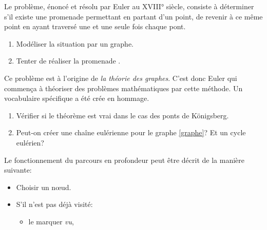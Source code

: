 \documentclass[a4paper,11pt]{article}
\begin{document}
\begin{Form}
\begin{exo}
Le problème, énoncé et résolu par Euler au XVIII° siècle, consiste à déterminer s'il existe une promenade permettant en partant d'un point, de revenir à ce même point en ayant traversé une et une seule fois chaque pont.
\begin{enumerate}
\item Modéliser la situation par un graphe.
\item Tenter de réaliser la promenade .
\end{enumerate}
Ce problème est à l'origine de \emph{la théorie des graphes}. C'est donc Euler qui commença à théoriser des problèmes mathématiques par cette méthode. Un vocabulaire spécifique a été crée en hommage.
\begin{center}
\end{center}
\begin{enumerate}[resume]
\item Vérifier si le théorème est vrai dans le cas des ponts de Königsberg.
\item Peut-on créer une chaîne eulérienne pour le graphe \ref{graphe}? Et un cycle eulérien?
\end{enumerate}
\end{exo}
\begin{exo}
Le fonctionnement du parcours en profondeur peut être décrit de la manière suivante:
\begin{itemize}
\item Choisir un nœud.
\item S'il n'est pas déjà visité:
\begin{itemize}
\item le marquer \emph{vu},

\end{itemize}
\end{itemize}
\end{exo}
\end{Form}
\end{document}
